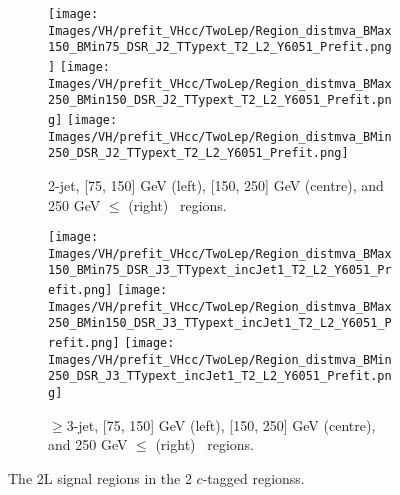 \newpage

\vspace*{\fill} 

\begin{figure}[h!]
    \centering
    \begin{subfigure}[b]{\textwidth}
        \centering
        \texttt{[image: Images/VH/prefit\_VHcc/TwoLep/Region\_distmva\_BMax150\_BMin75\_DSR\_J2\_TTypext\_T2\_L2\_Y6051\_Prefit.png]}
        \texttt{[image: Images/VH/prefit\_VHcc/TwoLep/Region\_distmva\_BMax250\_BMin150\_DSR\_J2\_TTypext\_T2\_L2\_Y6051\_Prefit.png]}
        \texttt{[image: Images/VH/prefit\_VHcc/TwoLep/Region\_distmva\_BMin250\_DSR\_J2\_TTypext\_T2\_L2\_Y6051\_Prefit.png]}
        \caption{2-jet, [75, 150] GeV (left), [150, 250] GeV (centre), and 250  GeV $\leq$ (right) \ptv\ regions.}
        \label{fig:plots_VHcc_2L_SR_2c_2J}
    \end{subfigure}
    \begin{subfigure}[b]{\textwidth}
        \centering
        \texttt{[image: Images/VH/prefit\_VHcc/TwoLep/Region\_distmva\_BMax150\_BMin75\_DSR\_J3\_TTypext\_incJet1\_T2\_L2\_Y6051\_Prefit.png]}
        \texttt{[image: Images/VH/prefit\_VHcc/TwoLep/Region\_distmva\_BMax250\_BMin150\_DSR\_J3\_TTypext\_incJet1\_T2\_L2\_Y6051\_Prefit.png]}
        \texttt{[image: Images/VH/prefit\_VHcc/TwoLep/Region\_distmva\_BMin250\_DSR\_J3\_TTypext\_incJet1\_T2\_L2\_Y6051\_Prefit.png]}
        \caption{$\geq$3-jet, [75, 150] GeV (left), [150, 250] GeV (centre), and 250  GeV $\leq$ (right) \ptv\ regions.}
        \label{fig:plots_VHcc_2L_SR_2c_3J}
    \end{subfigure}
    \caption{The 2L signal regions in the 2 $c$-tagged regionss.}
    \label{fig:plots_VHcc_2L_SR_2c}
\end{figure}
